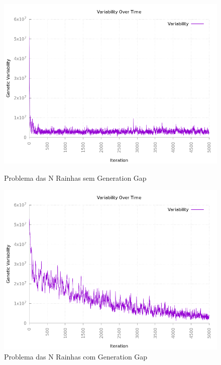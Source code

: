 \documentclass[12pt]{article}
\begin{document}
\begin{figure}[h!]
    \centering
    \begin{minipage}{0.47\textwidth}
        \centering
        \includegraphics[width=\textwidth]{pictures/queensvarscalingoff}
        \caption{Problema das N Rainhas sem Generation Gap}
        \label{f310}
    \end{minipage}
    \begin{minipage}{0.47\textwidth}
        \centering
        \includegraphics[width=\textwidth]{pictures/64queensvariabilitygengap}
        \caption{Problema das N Rainhas com Generation Gap}
        \label{gengap}
    \end{minipage}
\end{figure}
\end{document}
